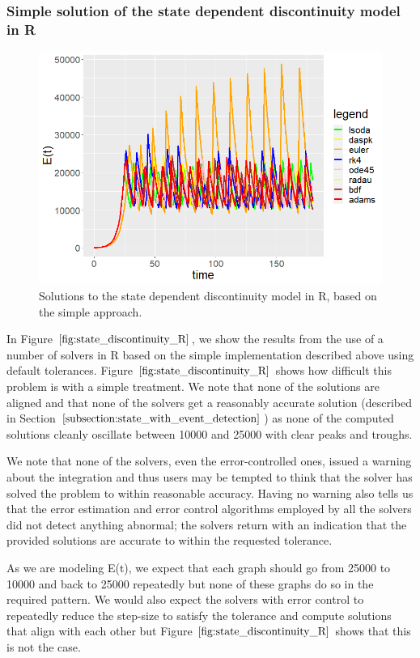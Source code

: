 \subsubsection{Simple solution of the state dependent discontinuity model in R}
\begin{figure}[H]
\centering
\includegraphics[width=0.7\linewidth]{./figures/state_discontinuity_R}
\caption{Solutions to the state dependent discontinuity model in R, based on the simple approach.}
\label{fig:state_discontinuity_R}
\end{figure}
In Figure $\ref{fig:state_discontinuity_R}$, we show the results from the use of a number of solvers in R based on the simple implementation described above using default tolerances. Figure $\ref{fig:state_discontinuity_R}$ shows how difficult this problem is with a simple treatment. We note that none of the solutions are aligned and that none of the solvers get a reasonably accurate solution (described in Section $\ref{subsection:state_with_event_detection}$) as none of the computed solutions cleanly oscillate between 10000 and 25000 with clear peaks and troughs.

We note that none of the solvers, even the error-controlled ones, issued a warning about the integration and thus users may be tempted to think that the solver has solved the problem to within reasonable accuracy. Having no warning also tells us that the error estimation and error control algorithms employed by all the solvers did not detect anything abnormal; the solvers return with an indication that the provided solutions are accurate to within the requested tolerance.

As we are modeling E(t), we expect that each graph should go from 25000 to 10000 and back to 25000 repeatedly but none of these graphs do so in the required pattern. We would also expect the solvers with error control to repeatedly reduce the step-size to satisfy the tolerance and compute solutions that align with each other but Figure $\ref{fig:state_discontinuity_R}$ shows that this is not the case.

